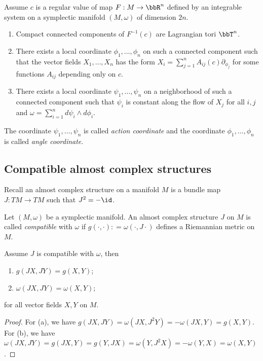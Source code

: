  \begin{theorem}
    Assume $c$ is a regular value of map $F: M \to \bbR^n$ defined by an integrable system on a symplectic manifold $(M, \omega)$ of dimension $2n$.
    \begin{enumerate}
      \item Compact connected components of $F^{-1}(c)$ are Lagrangian tori $\bbT^n$.
      \item There exists a local coordinate $\phi_1, \dots, \phi_n$ on such a connected component such that the vector fields $X_1, \dots, X_n$ has the form $X_i = \sum_{j=1}^n A_{ij}(c) \partial_{\phi_j}$ for some functions $A_{ij}$ depending only on $c$.
      \item There exists a local coordinate $\psi_1, \dots, \psi_n$ on a neighborhood of such a connected component such that $\psi_i$ is constant along the flow of $X_j$ for all $i, j$ and $\omega = \sum_{i=1}^n d\psi_i \wedge d\phi_i$.
    \end{enumerate}
  \end{theorem}

  \begin{remark}
    The coordinate $\psi_1, \dots, \psi_n$ is called \emph{action coordinate} and the coordinate $\phi_1, \dots, \phi_n$ is called \emph{angle coordinate}.
  \end{remark}


\subsection{Compatible almost complex structures}

  Recall an almost complex structure on a manifold $M$ is a bundle map $J: TM \to TM$ such that $J^2 = -\id$.

  \begin{definition}
    Let $(M, \omega)$ be a symplectic manifold.
    An almost complex structure $J$ on $M$ is called \emph{compatible} with $\omega$ if $g(\cdot, \cdot) \colon= \omega(\cdot, J\cdot)$ defines a Riemannian metric on $M$.
  \end{definition}

  \begin{lemma}
    Assume $J$ is compatible with $\omega$, then 
    \begin{enumerate}
      \item $g(JX, JY) = g(X, Y)$;
      \item $\omega(JX, JY) = \omega(X, Y)$;
    \end{enumerate}
    for all vector fields $X, Y$ on $M$.
  \end{lemma}
  \begin{proof}
    For (a), we have $g(JX, JY) = \omega(JX, J^2 Y) = -\omega(JX, Y) = g(X, Y)$.
    For (b), we have $\omega(JX, JY) = g(JX, Y) = g(Y, JX) = \omega(Y, J^2 X) = -\omega(Y, X) = \omega(X, Y)$.
  \end{proof}

